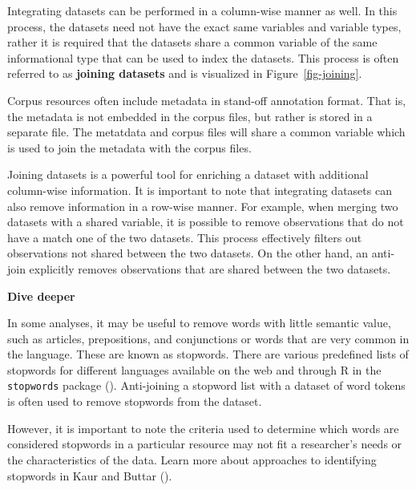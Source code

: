 \documentclass[
  letterpaper,
]{latex/krantz}
\theoremstyle{definition}
\theoremstyle{remark}
\begin{document}
Integrating datasets can be performed in a column-wise manner as well.
In this process, the datasets need not have the exact same variables and
variable types, rather it is required that the datasets share a common
variable of the same informational type that can be used to index the
datasets. This process is often referred to as \textbf{joining datasets}
and is visualized in Figure~\ref{fig-joining}.

Corpus resources often include metadata in stand-off annotation format.
That is, the metadata is not embedded in the corpus files, but rather is
stored in a separate file. The metatdata and corpus files will share a
common variable which is used to join the metadata with the corpus
files.

Joining datasets is a powerful tool for enriching a dataset with
additional column-wise information. It is important to note that
integrating datasets can also remove information in a row-wise manner.
For example, when merging two datasets with a shared variable, it is
possible to remove observations that do not have a match one of the two
datasets. This process effectively filters out observations not shared
between the two datasets. On the other hand, an anti-join explicitly
removes observations that are shared between the two datasets.

\begin{tcolorbox}[enhanced jigsaw, breakable, leftrule=.75mm, arc=.35mm, colframe=quarto-callout-color-frame, colback=white, left=2mm, bottomrule=.15mm, rightrule=.15mm, toprule=.15mm, opacityback=0]

\textbf{ Dive deeper}

In some analyses, it may be useful to remove words with little semantic
value, such as articles, prepositions, and conjunctions or words that
are very common in the language. These are known as stopwords. There are
various predefined lists of stopwords for different languages available
on the web and through R in the \texttt{stopwords} package
().
Anti-joining a stopword list with a dataset of word tokens is often used
to remove stopwords from the dataset.

However, it is important to note the criteria used to determine which
words are considered stopwords in a particular resource may not fit a
researcher's needs or the characteristics of the data. Learn more about
approaches to identifying stopwords in Kaur and Buttar
().

\end{tcolorbox}
\end{document}
